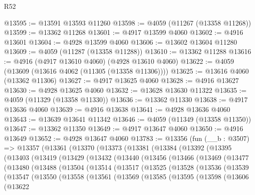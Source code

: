 \begin{lexlean}{R52}
\begin{coremodule}
@13595 := @13591 @13593 @11260
@13598 := @4059 (@11267 (@13358 @11268))
@13599 := @13362 @11268
@13601 := @4917 @13599 @4060
@13602 := @4916 @13601
@13604 := @4928 @13599 @4060
@13606 := @13602 @13604 @11280
@13609 := @4059 (@11287 (@13358 @11288))
@13610 := @13362 @11288
@13616 := @4916 (@4917 @13610 @4060) (@4928 @13610 @4060)
@13622 := @4059 (@13609 (@13616 @4062 (@11305 (@13358 @11306))))
@13625 := @13616 @4060 (@13362 @11306)
@13627 := @4917 @13625 @4060
@13628 := @4916 @13627
@13630 := @4928 @13625 @4060
@13632 := @13628 @13630 @11322
@13635 := @4059 (@11329 (@13358 @11330))
@13636 := @13362 @11330
@13638 := @4917 @13636 @4060
@13639 := @4916 @13638
@13641 := @4928 @13636 @4060
@13643 := @13639 @13641 @11342
@13646 := @4059 (@11349 (@13358 @11350))
@13647 := @13362 @11350
@13649 := @4917 @13647 @4060
@13650 := @4916 @13649
@13652 := @4928 @13647 @4060
@13783 := @13356
    (fun (__b : @3507) =>
    @13357
      (@13361
        (@13370
          (@13373
            (@13381
              (@13384
                (@13392
                  (@13395
                    (@13403
                      (@13419
                        (@13429
                          (@13432
                            (@13440
                              (@13456
                                (@13466
                                  (@13469
                                    (@13477
                                      (@13480
                                        (@13488
                                          (@13504
                                            (@13514
                                              (@13517
                                                (@13525
                                                  (@13528
                                                    (@13536
                                                      (@13539
                                                        (@13547
                                                          (@13550
                                                            (@13558
                                                              (@13561
                                                                (@13569
                                                                  (@13585
                                                                    (@13595
                                                                      (@13598
                                                                        (@13606
                                                                          (@13622

\end{coremodule}
\end{lexlean}
